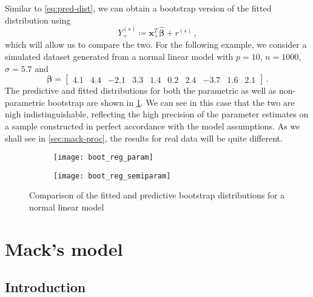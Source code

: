\documentclass[a4paper]{book}
\begin{document}
Similar to \cref{eq:pred-dist}, we can obtain a bootstrap version of the fitted distribution using
\begin{equation} \label{eq:fit-dist}
  Y_+^{(s)} \coloneqq \mathbf{x}_+^T \widehat{\bm{\beta}} + r^{(s)} \,,
\end{equation}
which will allow us to compare the two. For the following example, we consider a simulated dataset generated from a normal linear model with $p = 10$, $n = 1000$, $\sigma = 5.7$ and
\begin{displaymath}
  \bm{\beta} = \begin{bmatrix} 4.1 & 4.4 & -2.1 & 3.3 & 1.4 & 0.2 & 2.4 & -3.7 & 1.6 & 2.1 \end{bmatrix} \,.
\end{displaymath}
The predictive and fitted distributions for both the parametric as well as non-parametric bootstrap are shown in \cref{fig:boot-reg}. We can see in this case that the two are nigh indistinguishable, reflecting the high precision of the parameter estimates on a sample constructed in perfect accordance with the model assumptions. As we shall see in \cref{sec:mack-proc}, the results for real data will be quite different.

\begin{figure}[!htb]
  \begin{subfigure}{\linewidth}
    \texttt{[image: boot\_reg\_param]}
  \end{subfigure}
  \begin{subfigure}{\linewidth}
    \texttt{[image: boot\_reg\_semiparam]}
  \end{subfigure}
  \caption{Comparison of the fitted and predictive bootstrap distributions for a normal linear model}
  \label{fig:boot-reg}
\end{figure}

\chapter{Mack's model} \label{chapter:mack}

\section{Introduction} \label{sec:mack-intro}
\end{document}
